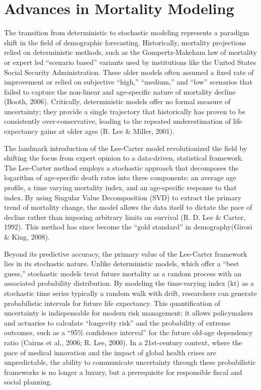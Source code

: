 \documentclass[
  12pt,
]{report}
\begin{document}
\section{Advances in Mortality
Modeling}\label{advances-in-mortality-modeling}

The transition from deterministic to stochastic modeling represents a
paradigm shift in the field of demographic forecasting. Historically,
mortality projections relied on deterministic methods, such as the
Gompertz-Makeham law of mortality or expert led ``scenario based''
variants used by institutions like the United States Social Security
Administration. These older models often assumed a fixed rate of
improvement or relied on subjective ``high,'' ``medium,'' and ``low''
scenarios that failed to capture the non-linear and age-specific nature
of mortality decline (Booth, 2006). Critically, deterministic models
offer no formal measure of uncertainty; they provide a single trajectory
that historically has proven to be consistently over-conservative,
leading to the repeated underestimation of life expectancy gains at
older ages (R. Lee \& Miller, 2001).

The landmark introduction of the Lee-Carter model revolutionized the
field by shifting the focus from expert opinion to a data-driven,
statistical framework. The Lee-Carter method employs a stochastic
approach that decomposes the logarithm of age-specific death rates into
three components: an average age profile, a time varying mortality
index, and an age-specific response to that index. By using Singular
Value Decomposition (SVD) to extract the primary trend of mortality
change, the model allows the data itself to dictate the pace of decline
rather than imposing arbitrary limits on survival (R. D. Lee \& Carter,
1992). This method has since become the ``gold standard'' in
demography(Girosi \& King, 2008).

Beyond its predictive accuracy, the primary value of the Lee-Carter
framework lies in its stochastic nature. Unlike deterministic models,
which offer a ``best guess,'' stochastic models treat future mortality
as a random process with an associated probability distribution. By
modeling the time-varying index (kt) as a stochastic time series
typically a random walk with drift, researchers can generate
probabilistic intervals for future life expectancy. This quantification
of uncertainty is indispensable for modern risk management; it allows
policymakers and actuaries to calculate ``longevity risk'' and the
probability of extreme outcomes, such as a ``95\% confidence interval''
for the future old-age dependency ratio (Cairns et al., 2006; R. Lee,
2000). In a 21st-century context, where the pace of medical innovation
and the impact of global health crises are unpredictable, the ability to
communicate uncertainty through these probabilistic frameworks is no
longer a luxury, but a prerequisite for responsible fiscal and social
planning.
\end{document}
